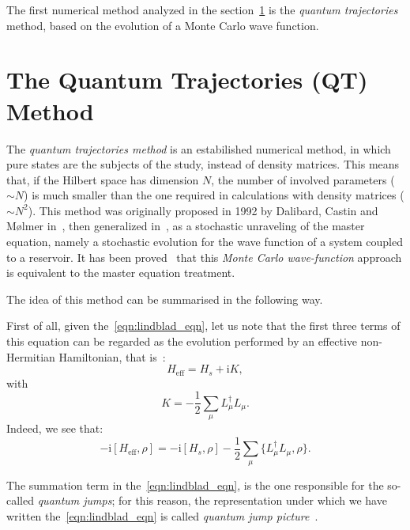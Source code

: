 The first numerical method analyzed in the section~\ref{chapt3_qtm} is the \emph{quantum trajectories} method, based on the evolution of a Monte Carlo wave function.

\section{The Quantum Trajectories (QT) Method}
\label{chapt3_qtm}
The \emph{quantum trajectories method} is an estabilished numerical method, in which pure states are the subjects of the study, instead of density matrices. This means that, if the Hilbert space has dimension $N$, the number of involved parameters ($\sim N$) is much smaller than the one required in calculations with density matrices ($\sim N^2$). This method was originally proposed in 1992 by Dalibard, Castin and Mølmer in~\cite{PhysRevLett.68.580}, then generalized in~\cite{Molmer:93}, as a stochastic unraveling of the master equation, namely a stochastic evolution for the wave function of a system coupled to a reservoir. It has been proved~\cite{PhysRevLett.68.580, Molmer:93} that this \emph{Monte Carlo wave-function} approach is equivalent to the master equation treatment.

The idea of this method can be summarised in the following way.

First of all, given the~\ref{eqn:lindblad_eqn}, let us note that the first three terms of this equation can be regarded as the evolution performed by an effective non-Hermitian Hamiltonian, that is~\cite{PhysRevA.69.062317}:
\begin{equation}
    H_{\text{eff}} = H_s + \text{i}K,
\end{equation}
with
\begin{equation}
    K = -\frac{1}{2}\sum_\mu L_{\mu}^{\dagger}L_{\mu}.
\end{equation}
Indeed, we see that:
\begin{equation*}
    -\text{i}[H_\text{eff}, \rho] = -\text{i}[H_s, \rho] - \frac{1}{2}\sum_\mu \{L_{\mu}^{\dagger}L_{\mu}, \rho\}.
\end{equation*}

The summation term in the~\ref{eqn:lindblad_eqn}, is the one responsible for the so-called \emph{quantum jumps}; for this reason, the representation under which we have written the~\ref{eqn:lindblad_eqn} is called \emph{quantum jump picture}~\cite{PhysRevA.69.062317}. 

